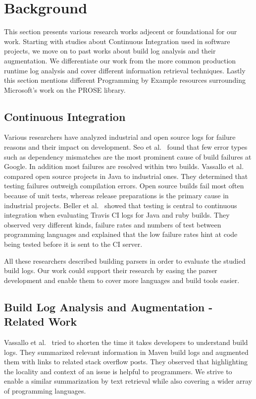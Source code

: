 \documentclass[\myrootdir/main.tex]{subfiles}
\begin{document}
\chapter{Background}
\label{sec:rw}
This section presents various research works adjecent or foundational for our work. Starting with studies about Continuous Integration used in software projects, we move on to past works about build log analysis and their augmentation. We differentiate our work from the more common production runtime log analysis and cover different information retrieval techniques. Lastly this section mentions different Programming by Example resources surrounding Microsoft's work on the PROSE library.

\section{Continuous Integration}
Various researchers have analyzed industrial and open source logs for failure reasons and their impact on development. Seo et al.~\cite{seo2014programmers} found that few error types such as dependency mismatches are the most prominent cause of build failures at Google. In addition most failures are resolved within two builds. Vassallo et al.~\cite{vassallo2017a-tale} compared open source projects in Java to industrial ones. They determined that testing failures outweigh compilation errors. Open source builds fail most often because of unit tests, whereas release preparations is the primary cause in industrial projects. Beller et al.~\cite{beller2017oops} showed that testing is central to continuous integration when evaluating Travis CI logs for Java and ruby builds. They observed very different kinds, failure rates and numbers of test between programming languages and explained that the low failure rates hint at code being tested before it is sent to the CI server.

All these researchers described building parsers in order to evaluate the studied build logs. Our work could support their research by easing the parser development and enable them to cover more languages and build tools easier.

\section{Build Log Analysis and Augmentation - Related Work}
\label{sec:rw-bl-analysis}
Vassallo et al.~\cite{vassallo2018un-break} tried to shorten the time it takes developers to understand build logs. They summarized relevant information in Maven build logs and augmented them with links to related stack overflow posts. They observed that highlighting the locality and context of an issue is helpful to programmers. We strive to enable a similar summarization by text retrieval while also covering a wider array of programming languages.
\end{document}
